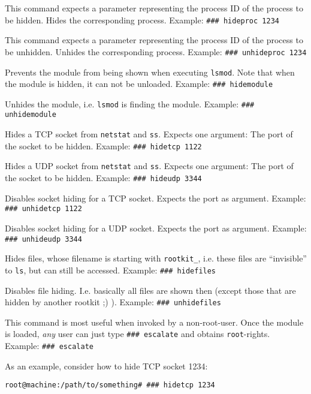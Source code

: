 \documentclass[10pt, letterpaper]{article}
\begin{document}
\begin{description}[font=\ttfamily]
\item[hideproc] This command expects a parameter representing the process ID of the process to be hidden. Hides the corresponding process. Example: \texttt{\#\#\# hideproc 1234 }
\item[unhideproc] This command expects a parameter representing the process ID of the process to be unhidden. Unhides the corresponding process. Example: \texttt{\#\#\# unhideproc 1234 }
\item[hidemodule] Prevents the module from being shown when executing \texttt{lsmod}. Note that when the module is hidden, it can not be unloaded. Example: \texttt{\#\#\# hidemodule }
\item[unhidemodule] Unhides the module, i.e. \texttt{lsmod} is finding the module. Example: \texttt{\#\#\# unhidemodule }
\item[hidetcp] Hides a TCP socket from \texttt{netstat} and \texttt{ss}. Expects one argument: The port of the socket to be hidden. Example: \texttt{\#\#\# hidetcp 1122 }
\item[hideudp] Hides a UDP socket from \texttt{netstat} and \texttt{ss}. Expects one argument: The port of the socket to be hidden. Example: \texttt{\#\#\# hideudp 3344 }
\item[unhidetcp] Disables socket hiding for a TCP socket. Expects the port as argument. Example: \texttt{\#\#\# unhidetcp 1122 }
\item[unhideudp] Disables socket hiding for a UDP socket. Expects the port as argument. Example: \texttt{\#\#\# unhideudp 3344 }
\item[hidefiles] Hides files, whose filename is starting with \texttt{rootkit\_}, i.e. these files are ``invisible'' to \texttt{ls}, but can still be accessed. Example: \texttt{\#\#\# hidefiles }
\item[unhidefiles] Disables file hiding. I.e. basically all files are shown then (except those that are hidden by another rootkit ;) ). Example: \texttt{\#\#\# unhidefiles }
\item[escalate] This command is most useful when invoked by a non-root-user. Once the module is loaded, \emph{any} user can just type \texttt{\#\#\# escalate} and obtains \texttt{root}-rights. Example: \texttt{\#\#\# escalate }
\end{description}

As an example, consider how to hide TCP socket 1234:

\begin{verbatim}
root@machine:/path/to/something# ### hidetcp 1234
\end{verbatim}
\end{document}
